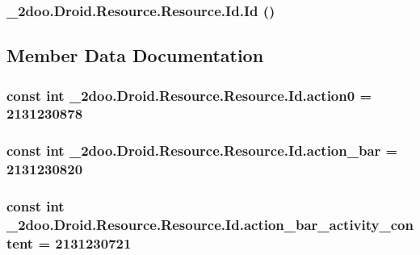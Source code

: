 \hypertarget{class__2doo_1_1_droid_1_1_resource_1_1_id_bc4f6d9a468ddf441eb64eeb0590b9b1}{
\subsubsection[{Id}]{\setlength{\rightskip}{0pt plus 5cm}\_\-2doo.Droid.Resource.Resource.Id.Id ()}}
\label{class__2doo_1_1_droid_1_1_resource_1_1_id_bc4f6d9a468ddf441eb64eeb0590b9b1}




\subsection{Member Data Documentation}
\hypertarget{class__2doo_1_1_droid_1_1_resource_1_1_id_1cd97586fad14d0a643013ed5e2a6ef9}{
\subsubsection[{action0}]{\setlength{\rightskip}{0pt plus 5cm}const int \_\-2doo.Droid.Resource.Resource.Id.action0 = 2131230878}}
\label{class__2doo_1_1_droid_1_1_resource_1_1_id_1cd97586fad14d0a643013ed5e2a6ef9}


\hypertarget{class__2doo_1_1_droid_1_1_resource_1_1_id_05f35cd9ab7e24aae3f15c61a16a40a7}{
\subsubsection[{action\_\-bar}]{\setlength{\rightskip}{0pt plus 5cm}const int \_\-2doo.Droid.Resource.Resource.Id.action\_\-bar = 2131230820}}
\label{class__2doo_1_1_droid_1_1_resource_1_1_id_05f35cd9ab7e24aae3f15c61a16a40a7}


\hypertarget{class__2doo_1_1_droid_1_1_resource_1_1_id_3c025346d55ef44663cb1a3050f7ce70}{
\subsubsection[{action\_\-bar\_\-activity\_\-content}]{\setlength{\rightskip}{0pt plus 5cm}const int \_\-2doo.Droid.Resource.Resource.Id.action\_\-bar\_\-activity\_\-content = 2131230721}}
\label{class__2doo_1_1_droid_1_1_resource_1_1_id_3c025346d55ef44663cb1a3050f7ce70}


